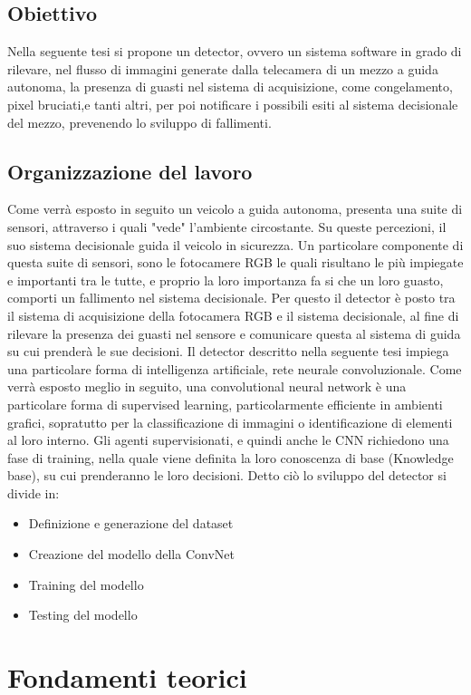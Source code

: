 \documentclass[14pt]{extarticle}
\begin{document}
\subsection{Obiettivo}
Nella seguente tesi si propone un detector, ovvero un sistema software in grado di rilevare, nel flusso di immagini generate dalla telecamera di un mezzo a guida autonoma, la presenza di guasti nel sistema di acquisizione, come congelamento, pixel bruciati,e tanti altri, per poi notificare i possibili esiti al sistema  decisionale del mezzo, prevenendo lo sviluppo di fallimenti.
\subsection{Organizzazione del lavoro} 
Come verrà esposto in seguito un veicolo a guida autonoma, presenta una suite di sensori, attraverso i quali "vede" l'ambiente circostante. Su queste percezioni, il suo sistema decisionale guida il veicolo in sicurezza.
Un particolare componente di questa suite di sensori, sono le fotocamere RGB le quali risultano le più impiegate e importanti tra le tutte, e proprio la  loro importanza fa si che un loro guasto,  comporti un fallimento nel sistema decisionale.
Per questo il detector è posto tra il  sistema di acquisizione della fotocamera RGB e il sistema decisionale, al fine di rilevare la presenza dei guasti nel sensore e comunicare questa al sistema di guida su cui prenderà  le sue decisioni.
Il detector descritto nella seguente tesi impiega una particolare forma di intelligenza artificiale, rete neurale convoluzionale.
Come verrà esposto meglio in seguito, una convolutional neural network è una particolare forma di supervised learning, particolarmente efficiente in ambienti grafici, sopratutto per la classificazione di  immagini o identificazione di elementi al loro interno. Gli agenti supervisionati, e quindi anche le CNN richiedono una fase di training, nella quale viene definita  la loro conoscenza di base (Knowledge base), su cui prenderanno le loro decisioni.
Detto ciò lo sviluppo del detector si divide in:
\begin{itemize}
\item Definizione e generazione del dataset
\item Creazione del modello della ConvNet
\item Training del modello 
\item Testing del modello
\end{itemize}

\section{Fondamenti teorici}
\end{document}
